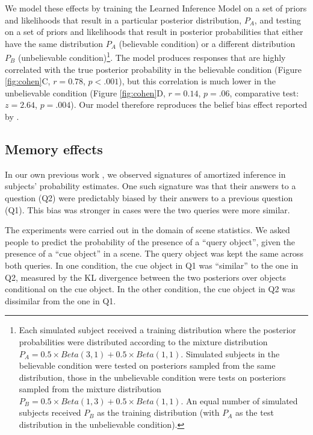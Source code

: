 We model these effects by training the Learned Inference Model on a set of priors and likelihoods that result in a particular posterior distribution, $P_A$, and testing on a set of priors and likelihoods that result in posterior probabilities that either have the same distribution $P_A$ (believable condition) or a different distribution $P_B$ (unbelievable condition)\footnote{Each simulated subject received a training distribution where the posterior probabilities were distributed according to the mixture distribution $P_A = 0.5 \times Beta(3, 1) + 0.5 \times Beta(1, 1)$. Simulated subjects in the believable condition were tested on posteriors sampled from the same distribution, those in the unbelievable condition were tests on posteriors sampled from the mixture distribution $P_B = 0.5 \times Beta(1, 3) + 0.5 \times Beta(1, 1)$. An equal number of simulated subjects received $P_B$ as the training distribution (with $P_A$ as the test distribution in the unbelievable condition).}. The model produces responses that are highly correlated with the true posterior probability in the believable condition (Figure \ref{fig:cohen}C, $r=0.78$, $p<.001$), but this correlation is much lower in the unbelievable condition (Figure \ref{fig:cohen}D, $r=0.14$, $p=.06$, comparative test: $z=2.64$, $p=.004$). Our model therefore reproduces the belief bias effect reported by \cite{cohen2017beliefs}.

\subsection{Memory effects}

In our own previous work \citep{dasgupta2018remembrance}, we observed signatures of amortized inference in subjects' probability estimates. One such signature was that their answers to a question (Q2) were predictably biased by their answers to a previous question (Q1). This bias was stronger in cases were the two queries were more similar.

The experiments were carried out in the domain of scene statistics. We asked people to predict the probability of the presence of a ``query object'', given the presence of a ``cue object'' in a scene. The query object was kept the same across both queries. In one condition, the cue object in Q1 was ``similar'' to the one in Q2, measured by the KL divergence between the two posteriors over objects conditional on the cue object. In the other condition, the cue object in Q2 was dissimilar from the one in Q1.

